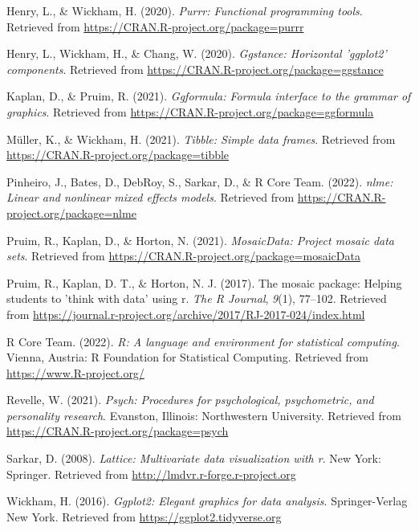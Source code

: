 \documentclass[
  english,
  man,floatsintext]{apa6}
\begin{document}
\leavevmode\hypertarget{ref-R-purrr}{}%
Henry, L., \& Wickham, H. (2020). \emph{Purrr: Functional programming tools}. Retrieved from \url{https://CRAN.R-project.org/package=purrr}

\leavevmode\hypertarget{ref-R-ggstance}{}%
Henry, L., Wickham, H., \& Chang, W. (2020). \emph{Ggstance: Horizontal 'ggplot2' components}. Retrieved from \url{https://CRAN.R-project.org/package=ggstance}

\leavevmode\hypertarget{ref-R-ggformula}{}%
Kaplan, D., \& Pruim, R. (2021). \emph{Ggformula: Formula interface to the grammar of graphics}. Retrieved from \url{https://CRAN.R-project.org/package=ggformula}

\leavevmode\hypertarget{ref-R-tibble}{}%
Müller, K., \& Wickham, H. (2021). \emph{Tibble: Simple data frames}. Retrieved from \url{https://CRAN.R-project.org/package=tibble}

\leavevmode\hypertarget{ref-R-nlme}{}%
Pinheiro, J., Bates, D., DebRoy, S., Sarkar, D., \& R Core Team. (2022). \emph{nlme: Linear and nonlinear mixed effects models}. Retrieved from \url{https://CRAN.R-project.org/package=nlme}

\leavevmode\hypertarget{ref-R-mosaicData}{}%
Pruim, R., Kaplan, D., \& Horton, N. (2021). \emph{MosaicData: Project mosaic data sets}. Retrieved from \url{https://CRAN.R-project.org/package=mosaicData}

\leavevmode\hypertarget{ref-R-mosaic}{}%
Pruim, R., Kaplan, D. T., \& Horton, N. J. (2017). The mosaic package: Helping students to 'think with data' using r. \emph{The R Journal}, \emph{9}(1), 77--102. Retrieved from \url{https://journal.r-project.org/archive/2017/RJ-2017-024/index.html}

\leavevmode\hypertarget{ref-R-base}{}%
R Core Team. (2022). \emph{R: A language and environment for statistical computing}. Vienna, Austria: R Foundation for Statistical Computing. Retrieved from \url{https://www.R-project.org/}

\leavevmode\hypertarget{ref-R-psych}{}%
Revelle, W. (2021). \emph{Psych: Procedures for psychological, psychometric, and personality research}. Evanston, Illinois: Northwestern University. Retrieved from \url{https://CRAN.R-project.org/package=psych}

\leavevmode\hypertarget{ref-R-lattice}{}%
Sarkar, D. (2008). \emph{Lattice: Multivariate data visualization with r}. New York: Springer. Retrieved from \url{http://lmdvr.r-forge.r-project.org}

\leavevmode\hypertarget{ref-R-ggplot2}{}%
Wickham, H. (2016). \emph{Ggplot2: Elegant graphics for data analysis}. Springer-Verlag New York. Retrieved from \url{https://ggplot2.tidyverse.org}
\end{document}
